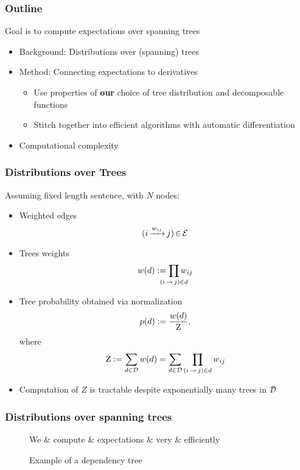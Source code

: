 \documentclass{beamer}
\newcommand{\defeq}{\vcentcolon=}
\begin{document}
\begin{frame}
\frametitle{Outline}

Goal is to compute expectations over spanning trees
\begin{itemize}
\item Background: Distributions over (spanning) trees
\item Method: Connecting expectations to derivatives
    \begin{itemize}
    \item Use properties of \textbf{our} choice of tree distribution and decomposable functions
    \item Stitch together into efficient algorithms with automatic differentiation
    \end{itemize}
\item Computational complexity
\end{itemize}
\end{frame}

\begin{frame}
\frametitle{Distributions over Trees}
Assuming fixed length sentence, with $N$ nodes:
\begin{itemize}
    \item Weighted edges $$(i\,{\xrightarrow[]{{w_{ij}}}}\, j) \,{\in}\, {\mathcal{E}}$$
    \item Trees weights $$\wtree{\tree} \defeq \smashoperator{\prod_{\edgeij\in\tree}} \wedge{ij}$$
    \item Tree probability obtained via normalization
        $$\ptree{\tree} \defeq \frac{\wtree{\tree}}{\wbar},$$
        where
        $$\wbar \defeq \sumtree \wtree{\tree}=\sumtree \prod_{\edgeij \in \tree} \wedge{ij}$$
    \item Computation of $Z$ is tractable despite exponentially many trees in ${\mathcal{D}}$
\end{itemize}
\end{frame}

\begin{frame}
    \frametitle{Distributions over spanning trees}
\begin{figure}[H]
    \centering
    \begin{dependency}[theme = simple]
    \begin{deptext}[column sep=0.5em]
      We \& compute \& expectations \& very \& efficiently \\
    \end{deptext}
    \end{dependency}
    \caption{Example of a dependency tree}
    \label{fig:deptree}
\end{figure}

\end{frame}
\end{document}
